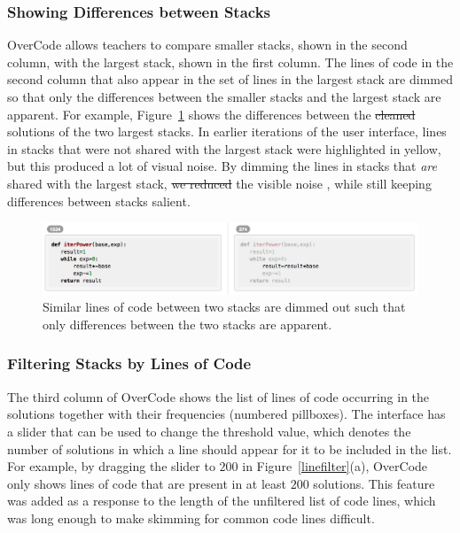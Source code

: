 \documentclass[12pt,twoside]{mitthesis}
\providecommand{\DIFaddtex}[1]{{\protect\color{blue}\uwave{#1}}} %
\providecommand{\DIFdeltex}[1]{{\protect\color{red}\sout{#1}}}                      %
\providecommand{\DIFaddbegin}{} %
\providecommand{\DIFaddend}{} %
\providecommand{\DIFdelbegin}{} %
\providecommand{\DIFdelend}{} %
\providecommand{\DIFadd}[1]{\texorpdfstring{\DIFaddtex{#1}}{#1}} %
\providecommand{\DIFdel}[1]{\texorpdfstring{\DIFdeltex{#1}}{}} %
\begin{document}
\subsubsection{Showing Differences between Stacks} OverCode allows teachers to compare smaller stacks, shown in the second column, with the largest stack, shown in the first column. The lines of code in the second column that also appear in the set of lines in the largest stack are dimmed so that only the differences between the smaller stacks and the largest stack are apparent. For example, Figure~\ref{stackdifferences} shows the differences between the \DIFdelbegin \DIFdel{cleaned }\DIFdelend \DIFaddbegin \DIFadd{platonic }\DIFaddend solutions of the two largest stacks. In earlier iterations of the user interface, lines in stacks that were not shared with the largest stack were highlighted in yellow, but this produced a lot of visual noise. By dimming the lines in stacks that \textit{are} shared with the largest stack, \DIFdelbegin \DIFdel{we reduced }\DIFdelend the visible noise \DIFaddbegin \DIFadd{is reduced}\DIFaddend , while still keeping differences between stacks salient.

\begin{figure}
\centering
\includegraphics[scale=0.42]{Body/figures/overcode/lineFadingScreenshot}
\caption{Similar lines of code between two stacks are dimmed out such that only differences between the two stacks are apparent.}
\label{stackdifferences}
\end{figure}



\subsubsection{Filtering Stacks by Lines of Code} The third column of OverCode shows the list of lines of code occurring in the solutions together with their frequencies (numbered pillboxes). The interface has a slider that can be used to change the threshold value, which denotes the number of solutions in which a line should appear for it to be included in the list. For example, by dragging the slider to $200$ in Figure~\ref{linefilter}(a), OverCode only shows lines of code that are present in at least $200$ solutions. This feature was added as a response to the length of the unfiltered list of code lines, which was long enough to make skimming for common code lines difficult.
\end{document}
